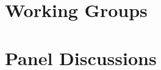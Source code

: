 \documentclass[a4paper,UKenglish]{dagrep}
\begin{document}



















\section{Working Groups}












\section{Panel Discussions}





\end{document}
